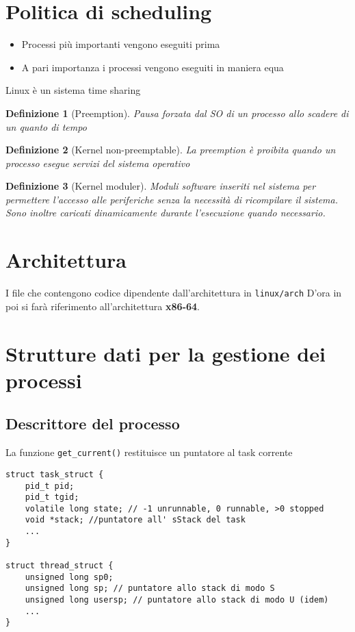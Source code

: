 \documentclass[12pt, a4paper]{report}
\newtheorem{definition}{Definizione}
\begin{document}
\section{Politica di scheduling}
\begin{itemize}
	\item Processi più importanti vengono eseguiti prima
	\item A pari importanza i processi vengono eseguiti in maniera equa
\end{itemize}
Linux è un sistema time sharing
\begin{definition}[Preemption]
	Pausa forzata dal SO di un processo allo scadere di un quanto di tempo
\end{definition}
\begin{definition}[Kernel non-preemptable]
	La preemption è proibita quando un processo esegue servizi del sistema
	operativo
\end{definition}
\begin{definition}[Kernel moduler]
	Moduli software inseriti nel sistema per permettere l'accesso alle
	periferiche senza la necessità di ricompilare il sistema. Sono inoltre
	caricati dinamicamente durante l'esecuzione quando necessario.
\end{definition}
\section{Architettura}
I file che contengono codice dipendente dall'architettura in \texttt{linux/arch}
D'ora in poi si farà riferimento all'architettura \textbf{x86-64}.
\section{Strutture dati per la gestione dei processi}
\subsection{Descrittore del processo}
La funzione \texttt{get\_current()} restituisce un puntatore al task corrente
\begin{verbatim}
struct task_struct {
    pid_t pid;
    pid_t tgid;
    volatile long state; // ‐1 unrunnable, 0 runnable, >0 stopped
    void *stack; //puntatore all' sStack del task
    ...
}

struct thread_struct {
    unsigned long sp0;
    unsigned long sp; // puntatore allo stack di modo S
    unsigned long usersp; // puntatore allo stack di modo U (idem)
    ...
}
\end{verbatim}
\end{document}
